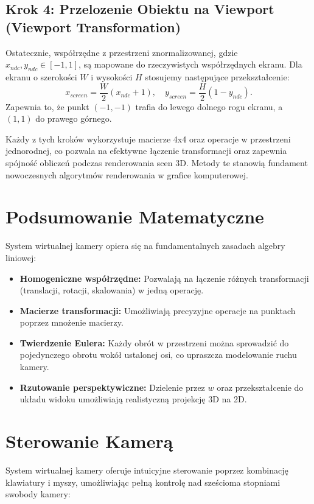 \documentclass[a4paper,12pt]{article}
\begin{document}
\subsection{Krok 4: Przelozenie Obiektu na Viewport (Viewport Transformation)}
Ostatecznie, współrzędne z przestrzeni znormalizowanej, gdzie \( x_{ndc}, y_{ndc} \in [-1,1] \), są mapowane do rzeczywistych współrzędnych ekranu.
Dla ekranu o szerokości \( W \) i wysokości \( H \) stosujemy następujące przekształcenie:
\[
x_{screen} = \frac{W}{2} \left( x_{ndc} + 1 \right), \quad y_{screen} = \frac{H}{2} \left( 1 - y_{ndc} \right).
\]
Zapewnia to, że punkt \((-1,-1)\) trafia do lewego dolnego rogu ekranu, a \((1,1)\) do prawego górnego.

\bigskip

Każdy z tych kroków wykorzystuje macierze 4x4 oraz operacje w przestrzeni jednorodnej, co pozwala na efektywne łączenie transformacji oraz zapewnia spójność obliczeń podczas renderowania scen 3D. Metody te stanowią fundament nowoczesnych algorytmów renderowania w grafice komputerowej.

\section{Podsumowanie Matematyczne}

System wirtualnej kamery opiera się na fundamentalnych zasadach algebry liniowej:
\begin{itemize}
    \item \textbf{Homogeniczne współrzędne:} Pozwalają na łączenie różnych transformacji (translacji, rotacji, skalowania) w jedną operację.
    \item \textbf{Macierze transformacji:} Umożliwiają precyzyjne operacje na punktach poprzez mnożenie macierzy.
    \item \textbf{Twierdzenie Eulera:} Każdy obrót w przestrzeni można sprowadzić do pojedynczego obrotu wokół ustalonej osi, co upraszcza modelowanie ruchu kamery.
    \item \textbf{Rzutowanie perspektywiczne:} Dzielenie przez \(w\) oraz przekształcenie do układu widoku umożliwiają realistyczną projekcję 3D na 2D.
\end{itemize}

\section{Sterowanie Kamerą}

System wirtualnej kamery oferuje intuicyjne sterowanie poprzez kombinację klawiatury i myszy, umożliwiając pełną kontrolę nad sześcioma stopniami swobody kamery:
\end{document}
